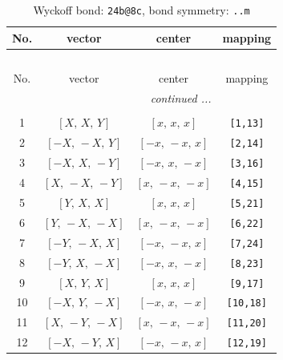 \documentclass[fleqn,8pt]{jsarticle}
\begin{document}
\begin{longtable}{cccc}
\caption{Wyckoff bond: {\tt 24b@8c}, bond symmetry: {\tt ..m}}
 \\
 \hline \hline
No. & vector & center & mapping \\ \hline \endfirsthead

\multicolumn{3}{l}{\tablename\ \thetable{}} \\
 \hline \hline
No. & vector & center & mapping \\ \hline \endhead

 \hline \hline
\multicolumn{3}{r}{\footnotesize\it continued ...} \\ \endfoot

 \hline \hline
\multicolumn{3}{r}{} \\ \endlastfoot

1 & $\left[ X,\, X,\, Y \right]$ & $\left[ x,\, x,\, x \right]$ & {\tt [1,13]} \\ \hline
2 & $\left[ - X,\, - X,\, Y \right]$ & $\left[ - x,\, - x,\, x \right]$ & {\tt [2,14]} \\ \hline
3 & $\left[ - X,\, X,\, - Y \right]$ & $\left[ - x,\, x,\, - x \right]$ & {\tt [3,16]} \\ \hline
4 & $\left[ X,\, - X,\, - Y \right]$ & $\left[ x,\, - x,\, - x \right]$ & {\tt [4,15]} \\ \hline
5 & $\left[ Y,\, X,\, X \right]$ & $\left[ x,\, x,\, x \right]$ & {\tt [5,21]} \\ \hline
6 & $\left[ Y,\, - X,\, - X \right]$ & $\left[ x,\, - x,\, - x \right]$ & {\tt [6,22]} \\ \hline
7 & $\left[ - Y,\, - X,\, X \right]$ & $\left[ - x,\, - x,\, x \right]$ & {\tt [7,24]} \\ \hline
8 & $\left[ - Y,\, X,\, - X \right]$ & $\left[ - x,\, x,\, - x \right]$ & {\tt [8,23]} \\ \hline
9 & $\left[ X,\, Y,\, X \right]$ & $\left[ x,\, x,\, x \right]$ & {\tt [9,17]} \\ \hline
10 & $\left[ - X,\, Y,\, - X \right]$ & $\left[ - x,\, x,\, - x \right]$ & {\tt [10,18]} \\ \hline
11 & $\left[ X,\, - Y,\, - X \right]$ & $\left[ x,\, - x,\, - x \right]$ & {\tt [11,20]} \\ \hline
12 & $\left[ - X,\, - Y,\, X \right]$ & $\left[ - x,\, - x,\, x \right]$ & {\tt [12,19]} \\
\end{longtable}
\renewcommand{\arraystretch}{1.2}
\end{document}
